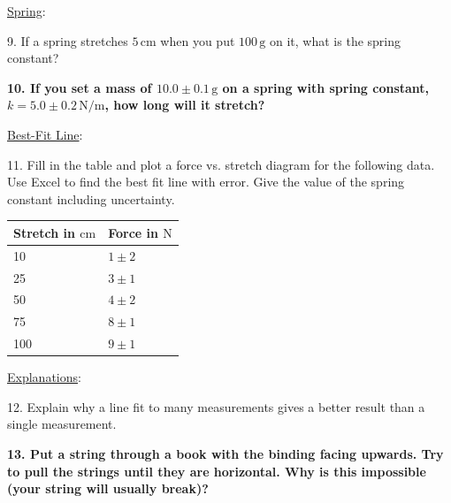 \noindent \underline{Spring}:\myskip

9. If a spring stretches $5\,\mathrm{cm}$ when you put $100\,\mathrm{g}$ on it, what is the spring constant? \myskip

{\bf{10. If you set a mass of $10.0 \pm 0.1\,\mathrm{g}$ on a spring with spring constant, $k = 5.0 \pm 0.2 \,\mathrm{N/m}$, how long will it stretch?}} \myskip

\noindent \underline{Best-Fit Line}: \myskip

11. Fill in the table and plot a force vs. stretch diagram for the following data. Use Excel to find the best fit line with error. Give the value of the spring constant including uncertainty.
\begin{table}[h]
    \centering
    \begin{tabular}{|l|l|}
        \hline
        Stretch in $\mathrm{cm}$ & Force in $\mathrm{N}$ \\ \hline
        10 & $1\pm 2$ \\ \hline
        25 & $3\pm 1$ \\ \hline
        50 & $4\pm 2$ \\ \hline
        75 & $8\pm 1$ \\ \hline
        100 & $9\pm 1$ \\ \hline
    \end{tabular}
\end{table}

\noindent \underline{Explanations}:\myskip

12. Explain why a line fit to many measurements gives a better result than a single measurement. \myskip

{\bf{13. Put a string through a book with the binding facing upwards. Try to pull the strings until they are horizontal.  Why is this impossible (your string will usually break)?}}
